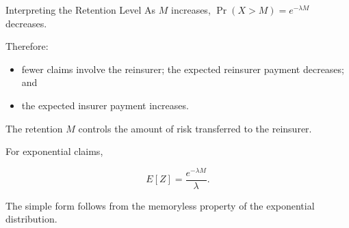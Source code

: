 \documentclass[
  ignorenonframetext,
  aspectratio=169,
]{beamer}
\providecommand{\tightlist}{%
  \setlength{\itemsep}{0pt}\setlength{\parskip}{0pt}}
\begin{document}
\begin{frame}{Interpreting the Retention Level}
\protect{}\label{interpreting-the-retention-level}
As \(M\) increases, \(\Pr(X>M)=e^{-\lambda M}\) decreases.

Therefore:

\begin{itemize}
\tightlist
\item
  fewer claims involve the reinsurer; the expected reinsurer payment
  decreases; and
\item
  the expected insurer payment increases.
\end{itemize}

The retention \(M\) controls the amount of risk transferred to the
reinsurer.

For exponential claims,

\[
E[Z]
=
\frac{e^{-\lambda M}}{\lambda}.
\]

The simple form follows from the memoryless property of the exponential
distribution.
\end{frame}
\end{document}
